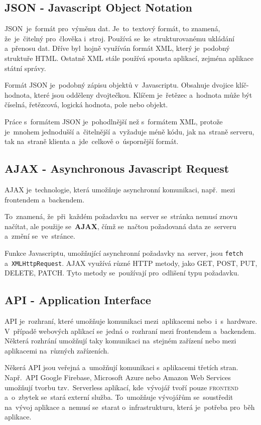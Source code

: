 \documentclass[14pt,a4paper]{article}
\begin{document}
        \subsection{JSON - Javascript Object Notation}
        \textsc{JSON}~je~formát pro~výměnu dat. Je~to~textový formát, to znamená, že~je~čitelný pro~člověka i~stroj. Používá se~ke~strukturovanému ukládání a~přenosu dat. Dříve byl~hojně využíván formát XML, který je~podobný struktuře HTML. Ostatně XML stále používá spousta aplikací, zejména aplikace státní správy.

        Formát JSON je~podobný zápisu objektů v~Javascriptu. Obsahuje dvojice klíč-hodnota, které jsou odděleny dvojtečkou. Klíčem je~řetězec a~hodnota může být číselná, řetězcová, logická hodnota, pole nebo objekt.
        
        Práce s~formátem JSON je~pohodlnější než s~formátem XML, protože je~mnohem jednodušší a~čitelnější a~vyžaduje méně kódu, jak na~straně serveru, tak na~straně klienta a~jde~celkově o~úspornější formát.

        \subsection{AJAX - Asynchronous Javascript Request}
        AJAX je~technologie, která umožňuje asynchronní komunikaci, např.~mezi frontendem a~backendem.

        To~znamená, že~při~každém požadavku na~server se~stránka nemusí znovu načítat, ale použije se~\textbf{AJAX}, čímž se~načtou požadovaná data ze~serveru a~změní se~ve~stránce.

        Funkce Javascriptu, umožňující asynchronní požadavky na~server, jsou \texttt{fetch} a~\texttt{XMLHttpRequest}. AJAX využívá různé HTTP metody, jako GET, POST, PUT, DELETE, PATCH. Tyto metody se~používají pro~odlišení typu požadavku.\parencite{ajax:mdn}

        \subsection{API - Application Interface}
        API je~rozhraní, které umožňuje komunikaci mezi~aplikacemi nebo~i~s~hardware. V~případě webových aplikací se~jedná o~rozhraní mezi frontendem a~backendem. Některá rozhrání umožňují taky komunikaci na~stejném zařízení nebo mezi aplikacemi na~různých zařízeních.
        
        Někerá API jsou veřejná a~umožňují komunikaci s~aplikacemi třetích stran. Např.~API Google Firebase, Microsoft Azure nebo Amazon Web Services umožňují tvorbu tzv.~Serverless aplikací, kde~vývojář tvoří pouze \textsc{frontend} a~o~zbytek se~stará externí služba. To~umožňuje vývojářům se~soustředit na~vývoj aplikace a~nemusí se~starat o~infrastrukturu, která je~potřeba pro~běh aplikace.
\end{document}
